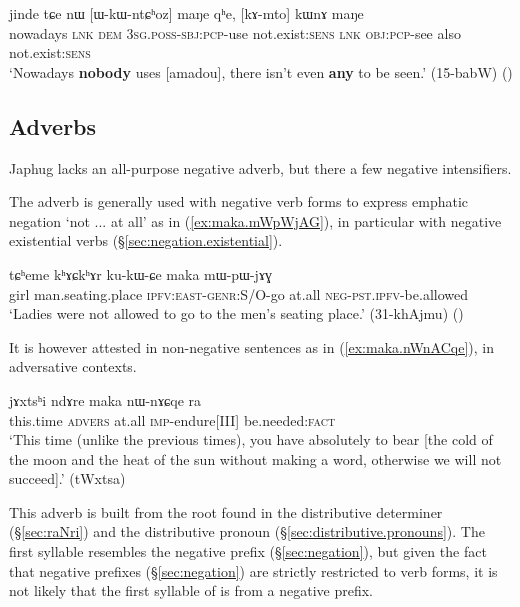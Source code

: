 \begin{exe}
	\ex \label{ex:WkWntChoz.maNe}
	\gll jinde tɕe nɯ [ɯ-kɯ-ntɕʰoz] maŋe qʰe, [kɤ-mto] kɯnɤ maŋe \\
	nowadays \textsc{lnk} \textsc{dem} \textsc{3sg}.\textsc{poss}-\textsc{sbj}:\textsc{pcp}-use not.exist:\textsc{sens} \textsc{lnk} \textsc{obj}:\textsc{pcp}-see also not.exist:\textsc{sens} \\
	\glt `Nowadays \textbf{nobody} uses [amadou], there isn't even \textbf{any} to be seen.' (15-babW)
()
\end{exe}

\subsection{Adverbs} \label{sec:negative.adverbs}
Japhug lacks an all-purpose negative adverb, but there a few negative intensifiers.

The adverb  is generally used with negative verb forms to express emphatic negation `not ... at all' as in (\ref{ex:maka.mWpWjAG}), in particular with negative existential verbs (§\ref{sec:negation.existential}).

\begin{exe}
	\ex \label{ex:maka.mWpWjAG}
	\gll   tɕʰeme kʰɤɕkʰɤr ku-kɯ-ɕe maka mɯ-pɯ-jɤɣ \\
	girl man.seating.place \textsc{ipfv}:\textsc{east}-\textsc{genr}:S/O-go at.all \textsc{neg}-\textsc{pst}.\textsc{ipfv}-be.allowed \\
	\glt `Ladies were not allowed to go to the men's seating place.' (31-khAjmu)
()
\end{exe} 

It is however attested in non-negative sentences as in (\ref{ex:maka.nWnACqe}), in adversative contexts.

\begin{exe}
	\ex \label{ex:maka.nWnACqe}
	\gll  jɤxtsʰi ndɤre maka nɯ-nɤɕqe ra \\
	this.time \textsc{advers} at.all \textsc{imp}-endure[III] be.needed:\textsc{fact} \\
	\glt `This time (unlike the previous times), you have absolutely to bear [the cold of the moon and the heat of the sun without making a word, otherwise we will not succeed].' (tWxtsa)
\end{exe} 

This adverb is built from the root  found in the distributive determiner   (§\ref{sec:raNri}) and the distributive pronoun    (§\ref{sec:distributive.pronouns}). The first syllable  resembles the negative prefix  (§\ref{sec:negation}), but given the fact that negative prefixes (§\ref{sec:negation}) are strictly restricted to verb forms, it is not likely that the first syllable of  is from a negative prefix.

